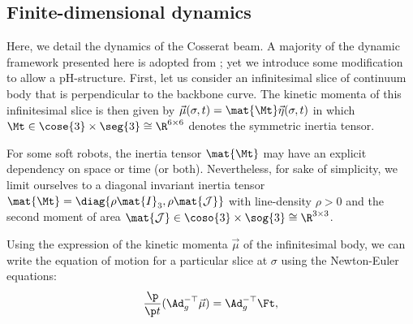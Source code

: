 \subsection{Finite-dimensional dynamics}
Here, we detail the dynamics of the Cosserat beam. A majority of the dynamic framework presented here is adopted from \cite{Boyer2021}; yet we introduce some modification to allow a pH-structure.
First, let us consider an infinitesimal slice of continuum body that is perpendicular to the backbone curve. The kinetic momenta of this infinitesimal slice is then given by $\vec{\mu}(\sigma,t) = \mat{\Mt} \vec{\eta}(\sigma,t)$ in which $\Mt \in \cose{3} \times \seg{3} \cong \R^{6\times 6}$ denotes the symmetric inertia tensor.
%
\begin{rmk}
For some soft robots, the inertia tensor $\mat{\Mt}$ may have an explicit dependency on space or time (or both). Nevertheless, for sake of simplicity, we limit ourselves to a diagonal invariant inertia tensor $\mat{\Mt} = \diag{\rho \mat{I}_3, \rho \mat{\mathcal{J}}}$ with line-density $\rho > 0$ and the second moment of area $\mat{\mathcal{J}} \in \coso{3} \times \sog{3} \cong \R^{3\times 3}$.
\end{rmk}
%
\noindent Using the expression of the kinetic momenta $\vec{\mu}$ of the infinitesimal body, we can write the equation of motion for a particular slice at $\sigma$ using the Newton-Euler equations:
%
\begin{equation}
\frac{\p }{\p t} (\Ad_{g}^{-\top} \vec{\mu}) = \Ad_{g}^{-\top}\Ft,\label{eq:newton_euler}
\end{equation}
%
